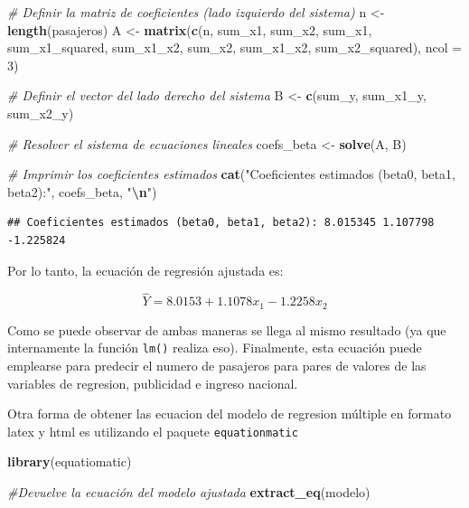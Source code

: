 \documentclass[
]{book}
\newenvironment{Shaded}{\begin{snugshade}}{\end{snugshade}}
\newcommand{\AttributeTok}[1]{\textcolor[rgb]{0.13,0.29,0.53}{#1}}
\newcommand{\CommentTok}[1]{\textcolor[rgb]{0.56,0.35,0.01}{\textit{#1}}}
\newcommand{\DecValTok}[1]{\textcolor[rgb]{0.00,0.00,0.81}{#1}}
\newcommand{\FunctionTok}[1]{\textcolor[rgb]{0.13,0.29,0.53}{\textbf{#1}}}
\newcommand{\NormalTok}[1]{#1}
\newcommand{\OtherTok}[1]{\textcolor[rgb]{0.56,0.35,0.01}{#1}}
\newcommand{\SpecialCharTok}[1]{\textcolor[rgb]{0.81,0.36,0.00}{\textbf{#1}}}
\newcommand{\StringTok}[1]{\textcolor[rgb]{0.31,0.60,0.02}{#1}}
\begin{document}
\begin{Shaded}
\begin{Highlighting}[]
\CommentTok{\# Definir la matriz de coeficientes (lado izquierdo del sistema)}
\NormalTok{n }\OtherTok{\textless{}{-}} \FunctionTok{length}\NormalTok{(pasajeros)}
\NormalTok{A }\OtherTok{\textless{}{-}} \FunctionTok{matrix}\NormalTok{(}\FunctionTok{c}\NormalTok{(n, sum\_x1, sum\_x2, sum\_x1, sum\_x1\_squared, sum\_x1\_x2, sum\_x2, sum\_x1\_x2, sum\_x2\_squared), }\AttributeTok{ncol =} \DecValTok{3}\NormalTok{)}

\CommentTok{\# Definir el vector del lado derecho del sistema}
\NormalTok{B }\OtherTok{\textless{}{-}} \FunctionTok{c}\NormalTok{(sum\_y, sum\_x1\_y, sum\_x2\_y)}

\CommentTok{\# Resolver el sistema de ecuaciones lineales}
\NormalTok{coefs\_beta }\OtherTok{\textless{}{-}} \FunctionTok{solve}\NormalTok{(A, B)}

\CommentTok{\# Imprimir los coeficientes estimados}
\FunctionTok{cat}\NormalTok{(}\StringTok{"Coeficientes estimados (beta0, beta1, beta2):"}\NormalTok{, coefs\_beta, }\StringTok{"}\SpecialCharTok{\textbackslash{}n}\StringTok{"}\NormalTok{)}
\end{Highlighting}
\end{Shaded}

\begin{verbatim}
## Coeficientes estimados (beta0, beta1, beta2): 8.015345 1.107798 -1.225824
\end{verbatim}

Por lo tanto, la ecuación de regresión ajustada es:

\[
\begin{equation}
\hat{Y} = 8.0153 + 1.1078x_{1} - 1.2258x_{2}
\end{equation}
\]

Como se puede observar de ambas maneras se llega al mismo resultado (ya que internamente la función \texttt{lm()} realiza eso). Finalmente, esta ecuación puede emplearse para predecir el numero de pasajeros para pares de valores de las variables de regresion, publicidad e ingreso nacional.

Otra forma de obtener las ecuacion del modelo de regresion múltiple en formato latex y html es utilizando el paquete \texttt{equationmatic}

\begin{Shaded}
\begin{Highlighting}[]
\FunctionTok{library}\NormalTok{(equatiomatic)}

\CommentTok{\#Devuelve la ecuación del modelo ajustada}
\FunctionTok{extract\_eq}\NormalTok{(modelo)}
\end{Highlighting}
\end{Shaded}
\end{document}
